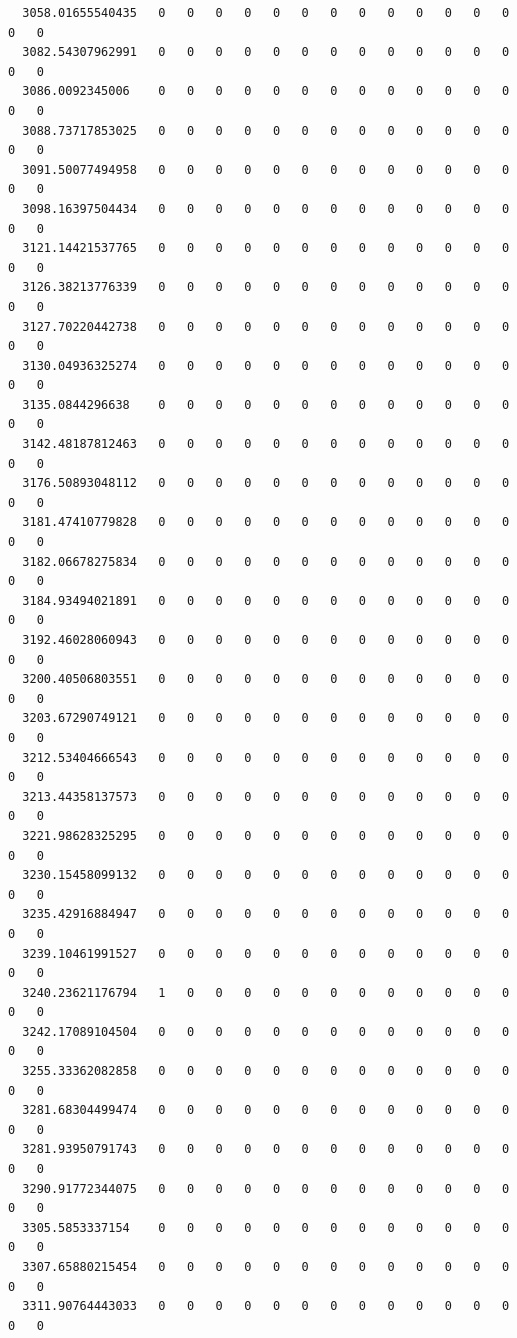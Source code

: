 \documentclass[
  letterpaper,
  DIV=11,
  numbers=noendperiod]{scrartcl}
\begin{document}
\begin{verbatim}
  3058.01655540435   0   0   0   0   0   0   0   0   0   0   0   0   0   0   0
  3082.54307962991   0   0   0   0   0   0   0   0   0   0   0   0   0   0   0
  3086.0092345006    0   0   0   0   0   0   0   0   0   0   0   0   0   0   0
  3088.73717853025   0   0   0   0   0   0   0   0   0   0   0   0   0   0   0
  3091.50077494958   0   0   0   0   0   0   0   0   0   0   0   0   0   0   0
  3098.16397504434   0   0   0   0   0   0   0   0   0   0   0   0   0   0   0
  3121.14421537765   0   0   0   0   0   0   0   0   0   0   0   0   0   0   0
  3126.38213776339   0   0   0   0   0   0   0   0   0   0   0   0   0   0   0
  3127.70220442738   0   0   0   0   0   0   0   0   0   0   0   0   0   0   0
  3130.04936325274   0   0   0   0   0   0   0   0   0   0   0   0   0   0   0
  3135.0844296638    0   0   0   0   0   0   0   0   0   0   0   0   0   0   0
  3142.48187812463   0   0   0   0   0   0   0   0   0   0   0   0   0   0   0
  3176.50893048112   0   0   0   0   0   0   0   0   0   0   0   0   0   0   0
  3181.47410779828   0   0   0   0   0   0   0   0   0   0   0   0   0   0   0
  3182.06678275834   0   0   0   0   0   0   0   0   0   0   0   0   0   0   0
  3184.93494021891   0   0   0   0   0   0   0   0   0   0   0   0   0   0   0
  3192.46028060943   0   0   0   0   0   0   0   0   0   0   0   0   0   0   0
  3200.40506803551   0   0   0   0   0   0   0   0   0   0   0   0   0   0   0
  3203.67290749121   0   0   0   0   0   0   0   0   0   0   0   0   0   0   0
  3212.53404666543   0   0   0   0   0   0   0   0   0   0   0   0   0   0   0
  3213.44358137573   0   0   0   0   0   0   0   0   0   0   0   0   0   0   0
  3221.98628325295   0   0   0   0   0   0   0   0   0   0   0   0   0   0   0
  3230.15458099132   0   0   0   0   0   0   0   0   0   0   0   0   0   0   0
  3235.42916884947   0   0   0   0   0   0   0   0   0   0   0   0   0   0   0
  3239.10461991527   0   0   0   0   0   0   0   0   0   0   0   0   0   0   0
  3240.23621176794   1   0   0   0   0   0   0   0   0   0   0   0   0   0   0
  3242.17089104504   0   0   0   0   0   0   0   0   0   0   0   0   0   0   0
  3255.33362082858   0   0   0   0   0   0   0   0   0   0   0   0   0   0   0
  3281.68304499474   0   0   0   0   0   0   0   0   0   0   0   0   0   0   0
  3281.93950791743   0   0   0   0   0   0   0   0   0   0   0   0   0   0   0
  3290.91772344075   0   0   0   0   0   0   0   0   0   0   0   0   0   0   0
  3305.5853337154    0   0   0   0   0   0   0   0   0   0   0   0   0   0   0
  3307.65880215454   0   0   0   0   0   0   0   0   0   0   0   0   0   0   0
  3311.90764443033   0   0   0   0   0   0   0   0   0   0   0   0   0   0   0
                  

\end{verbatim}
\end{document}
